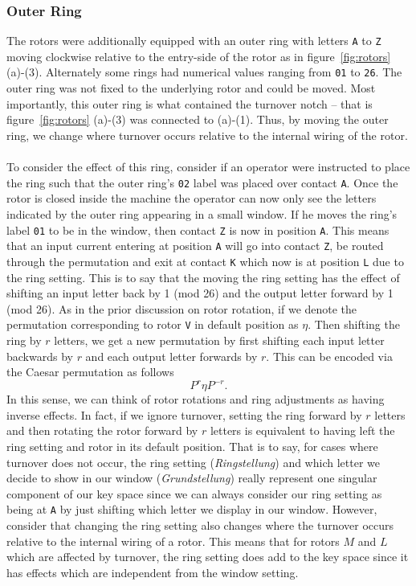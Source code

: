 \subsubsection{Outer Ring}

The rotors were additionally equipped with an outer ring with
letters \texttt{A} to \texttt{Z} moving clockwise relative to the
entry-side of the rotor as in figure~\ref{fig:rotors} (a)-(3). Alternately some rings had numerical values
ranging from \texttt{01} to \texttt{26}. The outer ring was not fixed to the underlying rotor and could be moved. Most importantly, this outer ring is what contained the turnover notch -- that is figure~\ref{fig:rotors} (a)-(3) was connected to (a)-(1). Thus, by moving the outer ring, we change where turnover occurs relative to the internal wiring of the rotor.
\\\\To consider the effect of this ring,
consider if an operator were instructed to place the ring such that
the outer ring's \texttt{02} label was placed over contact \texttt{A}. Once
the rotor is closed inside the machine
the operator can now only see the letters indicated by the outer ring
appearing in a small window. If he moves the ring's label \texttt{01}
to be in the window, then contact \texttt{Z} is now in position
\texttt{A}. This means that an input current
entering at position \texttt{A} will go into contact \texttt{Z}, be
routed through the permutation and exit
at contact \texttt{K} which now is at position \texttt{L} due to the
ring setting. This is to say that the moving the ring
setting has the effect of shifting an input letter back by 1 (mod 26)
and the output letter forward by 1 (mod 26).
As in the prior discussion on rotor rotation, if we denote the
permutation corresponding to rotor \texttt{V} in default position as
$\eta$. Then shifting the ring by $r$ letters, we get a new
permutation by first shifting each input letter backwards by $r$ and
each output letter forwards by $r$. This can be encoded via the
Caesar permutation as follows
\[
  {P^{r}}\eta{P^{-r}}.
\]
In this sense, we can think of rotor rotations and ring adjustments
as having inverse effects. In fact, if we ignore turnover, setting
the ring forward by $r$ letters and then rotating the rotor forward by $r$
letters is equivalent to having left the ring setting and rotor in
its default position. That is to say, for cases where turnover does
not occur, the ring setting (\emph{Ringstellung}) and which letter
we decide to show in our window (\emph{Grundstellung}) really
represent one singular component of our key space since we can always
consider our ring setting as being at \texttt{A} by just shifting
which letter we display in our window.
However, consider that changing the ring
setting also changes where the turnover occurs relative to the
internal wiring of a rotor. This means that for rotors $M$ and $L$
which are affected by turnover, the ring setting does add to
the key space since it has effects which are independent from the
window setting.


